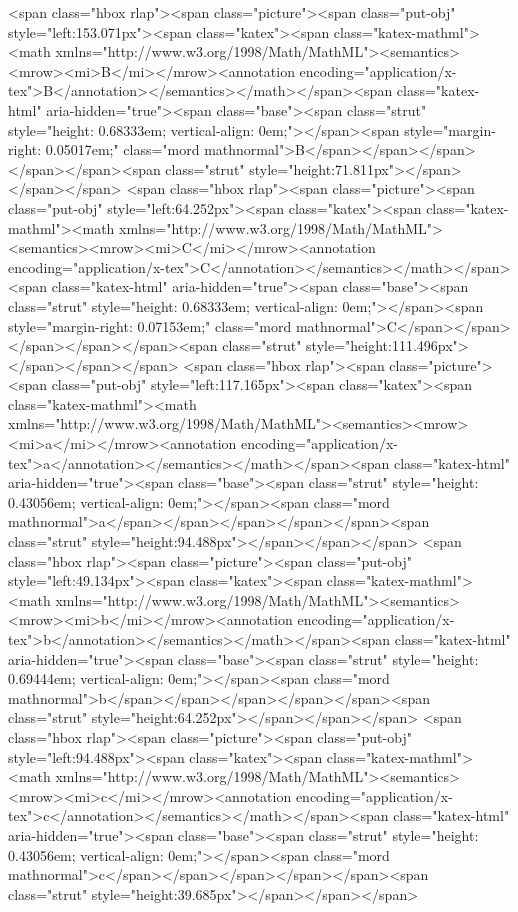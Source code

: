<span class="hbox rlap"><span class="picture"><span class="put-obj" style="left:153.071px"><span class="katex"><span class="katex-mathml"><math xmlns="http://www.w3.org/1998/Math/MathML"><semantics><mrow><mi>B</mi></mrow><annotation encoding="application/x-tex">B</annotation></semantics></math></span><span class="katex-html" aria-hidden="true"><span class="base"><span class="strut" style="height: 0.68333em; vertical-align: 0em;"></span><span style="margin-right: 0.05017em;" class="mord mathnormal">B</span></span></span></span></span><span class="strut" style="height:71.811px"></span></span></span>
<span class="hbox rlap"><span class="picture"><span class="put-obj" style="left:64.252px"><span class="katex"><span class="katex-mathml"><math xmlns="http://www.w3.org/1998/Math/MathML"><semantics><mrow><mi>C</mi></mrow><annotation encoding="application/x-tex">C</annotation></semantics></math></span><span class="katex-html" aria-hidden="true"><span class="base"><span class="strut" style="height: 0.68333em; vertical-align: 0em;"></span><span style="margin-right: 0.07153em;" class="mord mathnormal">C</span></span></span></span></span><span class="strut" style="height:111.496px"></span></span></span>
<span class="hbox rlap"><span class="picture"><span class="put-obj" style="left:117.165px"><span class="katex"><span class="katex-mathml"><math xmlns="http://www.w3.org/1998/Math/MathML"><semantics><mrow><mi>a</mi></mrow><annotation encoding="application/x-tex">a</annotation></semantics></math></span><span class="katex-html" aria-hidden="true"><span class="base"><span class="strut" style="height: 0.43056em; vertical-align: 0em;"></span><span class="mord mathnormal">a</span></span></span></span></span><span class="strut" style="height:94.488px"></span></span></span>
<span class="hbox rlap"><span class="picture"><span class="put-obj" style="left:49.134px"><span class="katex"><span class="katex-mathml"><math xmlns="http://www.w3.org/1998/Math/MathML"><semantics><mrow><mi>b</mi></mrow><annotation encoding="application/x-tex">b</annotation></semantics></math></span><span class="katex-html" aria-hidden="true"><span class="base"><span class="strut" style="height: 0.69444em; vertical-align: 0em;"></span><span class="mord mathnormal">b</span></span></span></span></span><span class="strut" style="height:64.252px"></span></span></span>
<span class="hbox rlap"><span class="picture"><span class="put-obj" style="left:94.488px"><span class="katex"><span class="katex-mathml"><math xmlns="http://www.w3.org/1998/Math/MathML"><semantics><mrow><mi>c</mi></mrow><annotation encoding="application/x-tex">c</annotation></semantics></math></span><span class="katex-html" aria-hidden="true"><span class="base"><span class="strut" style="height: 0.43056em; vertical-align: 0em;"></span><span class="mord mathnormal">c</span></span></span></span></span><span class="strut" style="height:39.685px"></span></span></span>
